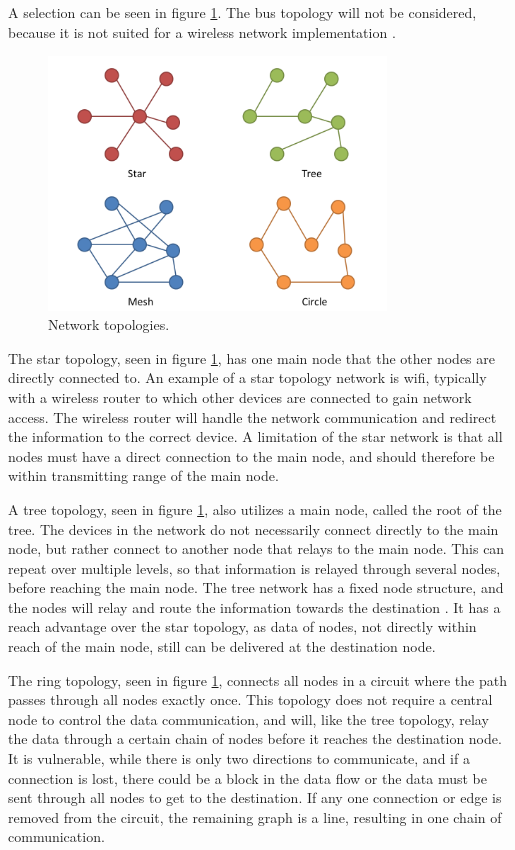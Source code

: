 A selection can be seen in figure \ref{fig:topologies}. The bus topology will not be considered, because it is not suited for a wireless network implementation \cite{engst2003wireless}. 

\begin{figure}[h!]
	\centering
	\includegraphics[width=0.8\textwidth]{figures/topologies.png}
	\caption{Network topologies.}
	\label{fig:topologies}
\end{figure}

The star topology, seen in figure \ref{fig:topologies}, has one main node that the other nodes are directly connected to. An example of a star topology network is wifi, typically with a wireless router to which other devices are connected to gain network access. The wireless router will handle the network communication and redirect the information to the correct device. A limitation of the star network is that all nodes must have a direct connection to the main node, and should therefore be within transmitting range of the main node.

A tree topology, seen in figure \ref{fig:topologies}, also utilizes a main node, called the root of the tree. The devices in the network do not necessarily connect directly to the main node, but rather connect to another node that relays to the main node. This can repeat over multiple levels, so that information is relayed through several nodes, before reaching the main node. The tree network has a fixed node structure, and the nodes will relay and route the information towards the destination \cite{kizza2015guide}. It has a reach advantage over the star topology, as data of nodes, not directly within reach of the main node, still can be delivered at the destination node.

The ring topology, seen in figure \ref{fig:topologies}, connects all nodes in a circuit where the path passes through all nodes exactly once. This topology does not require a central node to control the data communication, and will, like the tree topology, relay the data through a certain chain of nodes before it reaches the destination node. It is vulnerable, while there is only two directions to communicate, and if a connection is lost, there could be a block in the data flow or the data must be sent through all nodes to get to the destination. If any one connection or edge is removed from the circuit, the remaining graph is a line, resulting in one chain of communication.

